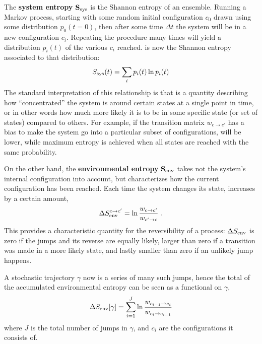 The \textbf{system entropy} \(\mathbf{S_\text{sys}{}}\) is the Shannon entropy of an ensemble. Running a Markov process, starting with some random initial configuration \(c_0\) drawn using some distribution \(p_0(t=0)\), then after some time \(\Delta t\) the system will be in a new configuration \(c_i\). Repeating the procedure many times will yield a distribution \(p_i(t)\) of the various \(c_i\) reached. \SSys{} is now the Shannon entropy associated to that distribution:
%
\begin{align}
	S_\text{sys}(t) = \sum_i p_i(t)\ln p_i(t)
\end{align}
%
The standard interpretation of this relationship is that \SSys{} is a quantity describing how ``concentrated'' the system is around certain states at a single point in time, or in other words how much more likely it is to be in some specific state (or set of states) compared to others. For example, if the transition matrix \(w_{c\to c'}\) has a bias to make the system go into a particular subset of configurations, \SSys will be lower, while maximum entropy is achieved when all states are reached with the same probability.

On the other hand, the \textbf{environmental entropy} \(\mathbf{S_\text{env}{}}\) takes not the system's internal configuration into account, but characterizes how the current configuration has been reached. Each time the system changes its state, \SEnv{} increases by a certain amount,
%
\begin{align}
	\label{eqn:SEnv single jump definition}
	\Delta S_\text{env}^{c\to c'} = \ln\frac{w_{c\to c'}}{w_{c'\to c}} ~.
\end{align}
%
This provides a characteristic quantity for the reversibility of a process: \(\Delta S_\text{env}\) is zero if the jumps and its reverse are equally likely, larger than zero if a transition was made in a more likely state, and lastly smaller than zero if an unlikely jump happens.

A stochastic trajectory \(\gamma\) now is a series of many such jumps, hence the total of the accumulated environmental entropy can be seen as a functional on \(\gamma\),
%
\begin{align}
	\label{eqn:SEnv rate jump functional}
	\Delta S_\text{env}[\gamma] = \sum_{i=1}^J\ln\frac{w_{c_{i-1}\to c_i}}{w_{c_i\to c_{i-1}}}
\end{align}
%
where \(J\) is the total number of jumps in \(\gamma\), and \(c_i\) are the configurations it consists of.




